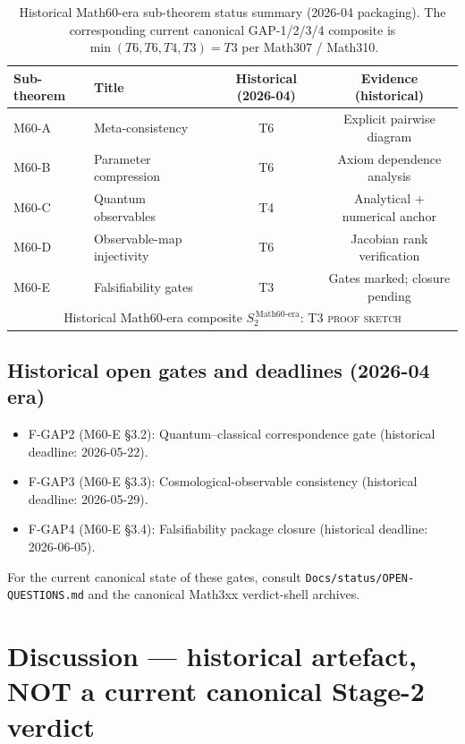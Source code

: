 \begin{table}[h]
\centering
\begin{tabular}{llcc}
\hline
Sub-theorem & Title & Historical (2026-04) & Evidence (historical) \\
\hline
M60-A & Meta-consistency               & T6 & Explicit pairwise diagram \\
M60-B & Parameter compression          & T6 & Axiom dependence analysis \\
M60-C & Quantum observables            & T4 & Analytical + numerical anchor \\
M60-D & Observable-map injectivity     & T6 & Jacobian rank verification \\
M60-E & Falsifiability gates           & T3 & Gates marked; closure pending \\
\hline
\multicolumn{4}{c}{Historical Math60-era composite $S_2^{\,\text{Math60-era}}$: T3 \textsc{proof sketch}} \\
\hline
\end{tabular}
\caption{Historical Math60-era sub-theorem status summary
(2026-04 packaging). The corresponding current canonical
GAP-1/2/3/4 composite is $\min(T6,T6,T4,T3) = T3$ per Math307 /
Math310.}
\end{table}

\subsection{Historical open gates and deadlines (2026-04 era)}

\begin{itemize}
\item F-GAP2 (M60-E §3.2): Quantum--classical correspondence gate
  (historical deadline: 2026-05-22).
\item F-GAP3 (M60-E §3.3): Cosmological-observable consistency
  (historical deadline: 2026-05-29).
\item F-GAP4 (M60-E §3.4): Falsifiability package closure
  (historical deadline: 2026-06-05).
\end{itemize}
For the current canonical state of these gates, consult
\texttt{Docs/status/OPEN-QUESTIONS.md} and the canonical Math3xx
verdict-shell archives.

\section{Discussion --- historical artefact, NOT a current canonical
Stage-2 verdict}\label{sec:discussion}

